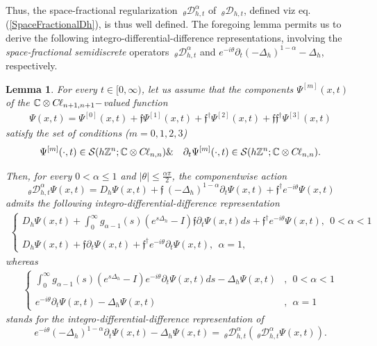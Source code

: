\documentclass{elsarticle}
\newcommand{\BC}{{\mathbb C}}
\newcommand{\BZ}{{\mathbb Z}}
\newcommand{\f}{{\mathfrak f}}
\newcommand{\cl}{C \kern -0.1em \ell}
\newtheorem{lemma}{Lemma}[section]
\begin{document}
Thus, the space-fractional regularization ${~}_\theta\mathcal{D}_{h,t}^\alpha$ of ${~}_\theta\mathcal{D}_{h,t}$, defined viz eq. (\ref{SpaceFractionalDh}), is thus well defined.
The foregoing lemma permits us to derive the following integro-differential-difference representations, involving the {\it space-fractional semidiscrete} operators ${~}_\theta\mathcal{D}_{h,t}^\alpha$ and $e^{-i\theta}\partial_t(-\Delta_h)^{1-\alpha}-\Delta_h$, respectively.
\begin{lemma}
	For every $t\in [0,\infty)$, let us assume that the components $\Psi^{[m]}(x,t)$ of the
	$\BC\otimes\cl_{n+1,n+1}-$valued function  \begin{eqnarray*}
		\Psi(x,t)=\Psi^{[0]}(x,t)+\f\Psi^{[1]}(x,t)+\f^\dagger\Psi^{[2]}(x,t)+\f\f^\dagger\Psi^{[3]}(x,t)
	\end{eqnarray*}
	satisfy the set of conditions ($m=0,1,2,3$)
	\begin{eqnarray*}
		\Psi^{[m]}(\cdot,t)\in \mathcal{S}(h\BZ^n;\BC \otimes \cl_{n,n}) &\&& \partial_t\Psi^{[m]}(\cdot,t)\in \mathcal{S}(h\BZ^n;\BC \otimes \cl_{n,n}). 
	\end{eqnarray*}
	
	
	Then, for every $0<\alpha\leq 1$ and $|\theta|\leq \frac{\alpha \pi}{2}$, the componentwise action
	$${~}_\theta\mathcal{D}_{h,t}^\alpha\Psi(x,t)=D_h\Psi(x,t)+ \f~(-\Delta_h)^{1-\alpha}\partial_t \Psi(x,t)+\f^\dagger e^{-i\theta}\Psi(x,t)$$ admits the following integro-differential-difference representation
	\begin{eqnarray*}
		\label{SpaceFractionalDirac} \left\{\begin{array}{lll} 
			D_h\Psi(x,t)+\displaystyle \int_{0}^{\infty} g_{\alpha-1}(s)\left(e^{s\Delta_h}-I\right)\f\partial_t\Psi(x,t)ds+\f^\dagger e^{-i\theta}\Psi(x,t),~~0<\alpha<1 &
			\\ \ \\
			D_h\Psi(x,t)+\f\partial_t\Psi(x,t)+\f^\dagger e^{-i\theta}\partial_t\Psi(x,t) ,~~\alpha=1,
		\end{array}\right.
	\end{eqnarray*}
	whereas
	\begin{eqnarray*}
		\label{SpaceFractionalLaplacian} \left\{\begin{array}{lll} 
			\displaystyle \int_{0}^{\infty} g_{\alpha-1}(s)\left(e^{s\Delta_h}-I\right)e^{-i\theta}\partial_t\Psi(x,t)ds-\Delta_h\Psi(x,t)&,~~0<\alpha<1
			\\ \ \\
			e^{-i\theta}\partial_t\Psi(x,t)-\Delta_h\Psi(x,t) &,~~\alpha=1
		\end{array}\right.
	\end{eqnarray*}
	stands for the integro-differential-difference representation of $$e^{-i\theta}(-\Delta_h)^{1-\alpha}\partial_t\Psi(x,t)-\Delta_h\Psi(x,t)={~}_\theta\mathcal{D}_{h,t}^\alpha\left({~}_\theta\mathcal{D}_{h,t}^\alpha\Psi(x,t)\right).$$
\end{lemma}
\end{document}
